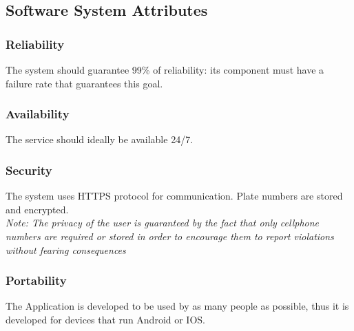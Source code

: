 \subsection{Software System Attributes}

\subsubsection{Reliability}

The system should guarantee 99\% of reliability: 
its component must have a failure rate that 
guarantees this goal.

\subsubsection{Availability}

The service should ideally be available 24/7.

\subsubsection{Security}

The system uses HTTPS protocol for communication. Plate numbers are 
stored and encrypted.\\
\textit{Note: The privacy of the user is guaranteed by the fact that 
only cellphone numbers are required or stored in order to encourage 
them to report violations without fearing consequences}

\subsubsection{Portability}

The Application is developed to be used by as many people as possible, 
thus it is developed for devices that run Android or IOS.